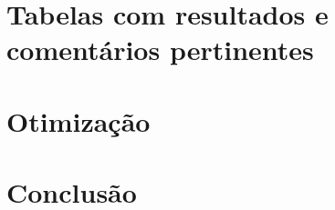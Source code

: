 \documentclass[a4paper,10pt]{article}
\begin{document}




\pagebreak

\section{Tabelas com resultados e comentários pertinentes}
\pagebreak

\section{Otimização}
\pagebreak

\section{Conclusão}
\pagebreak
\end{document}
